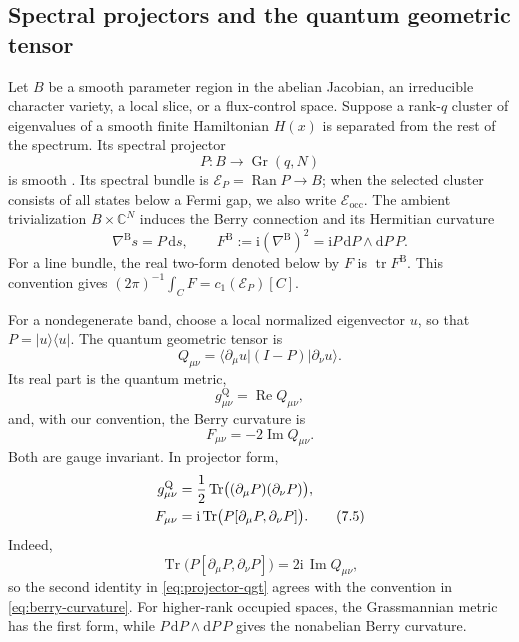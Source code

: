 \documentclass[11pt]{article}
\theoremstyle{definition}
\theoremstyle{remark}
\newcommand{\CC}{\mathbb C}
\newcommand{\Tr}{\operatorname{Tr}}
\newcommand{\tr}{\operatorname{tr}}
\newcommand{\dd}{\mathrm d}
\newcommand{\ii}{\mathrm i}
\newcommand{\ket}[1]{\lvert #1\rangle}
\newcommand{\bra}[1]{\langle #1\rvert}
\begin{document}
\subsection{Spectral projectors and the quantum geometric tensor}

Let \(B\) be a smooth parameter region in the abelian Jacobian, an irreducible
character variety, a local slice, or a flux-control space.  Suppose a
rank-\(q\) cluster of eigenvalues of a smooth finite Hamiltonian \(H(x)\) is
separated from the rest of the spectrum.  Its spectral projector
\[
                  P:B\longrightarrow\operatorname{Gr}(q,N)
                  \tag{7.1}\label{eq:projector-map}
\]
is smooth \cite{Kato}.  Its spectral bundle is
\(\mathscr E_P=\operatorname{Ran}P\to B\); when the selected cluster consists
of all states below a Fermi gap, we also write
\(\mathscr E_{\mathrm{occ}}\).
The ambient trivialization \(B\times\CC^N\) induces the Berry connection
and its Hermitian curvature
\[
       \nabla^{\mathrm B}s=P\,\dd s,\qquad
       F^{\mathrm B}:=\ii(\nabla^{\mathrm B})^2
          =\ii P\,\dd P\wedge\dd P\,P .
       \tag{7.1a}\label{eq:berry-connection-curvature}
\]
For a line bundle, the real two-form denoted below by \(F\) is
\(\tr F^{\mathrm B}\).  This convention gives
\((2\pi)^{-1}\int_C F=c_1(\mathscr E_P)[C]\).

For a nondegenerate band, choose a local normalized eigenvector \(u\), so that
\(P=\ket u\bra u\).  The quantum geometric tensor is
\[
    Q_{\mu\nu}
       =\bra{\partial_\mu u}(I-P)\ket{\partial_\nu u}.
       \tag{7.2}\label{eq:qgt}
\]
Its real part is the quantum metric,
\[
                g_{\mu\nu}^{\mathrm Q}=\operatorname{Re}Q_{\mu\nu},
                \tag{7.3}\label{eq:quantum-metric}
\]
and, with our convention, the Berry curvature is
\[
                F_{\mu\nu}=-2\operatorname{Im}Q_{\mu\nu}.
                \tag{7.4}\label{eq:berry-curvature}
\]
Both are gauge invariant.  In projector form,
\begin{align}
g_{\mu\nu}^{\mathrm Q}
   &=\frac12\Tr\bigl((\partial_\mu P)(\partial_\nu P)\bigr),\notag\\
F_{\mu\nu}
   &=\ii\Tr\bigl(P[\partial_\mu P,\partial_\nu P]\bigr).
   \tag{7.5}\label{eq:projector-qgt}
\end{align}
Indeed,
\[
 \Tr\bigl(P[\partial_\mu P,\partial_\nu P]\bigr)
    =2\ii\,\operatorname{Im}Q_{\mu\nu},
\]
so the second identity in \eqref{eq:projector-qgt} agrees with the convention
in \eqref{eq:berry-curvature}.
For higher-rank occupied spaces, the Grassmannian metric has the first form,
while \(P\,\dd P\wedge\dd P\,P\) gives the nonabelian Berry curvature.
\end{document}
